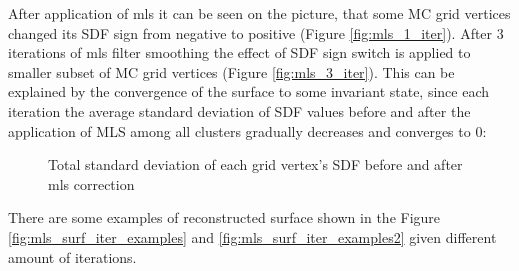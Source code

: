 After application of mls it can be seen on the picture, that some MC grid vertices changed its SDF sign from negative to positive (Figure \ref{fig:mls_1_iter}). After 3 iterations of mls filter smoothing the effect of SDF sign switch is applied to smaller subset of MC grid vertices (Figure \ref{fig:mls_3_iter}). This can be explained by the convergence of the surface to some invariant state, since each iteration the average standard deviation of SDF values before and after the application of MLS among all clusters gradually decreases and converges to 0:
\begin{figure}[H]
	\begin{center}
	\end{center}
	\caption{Total standard deviation of each grid vertex's SDF before and after mls correction}
	\label{fig:mls_std_dev}
\end{figure}
There are some examples of reconstructed surface shown in the Figure \ref{fig:mls_surf_iter_examples} and \ref{fig:mls_surf_iter_examples2} given different amount of iterations.
